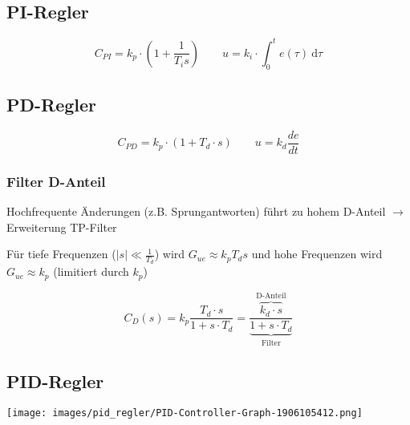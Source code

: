 \documentclass[
  10pt,
  a4paper,
  twocolumn]{article}
\numberwithin{equation}{section}
\begin{document}
\subsection{PI-Regler}\label{pi-regler}

\[
C_{PI}=k_p\cdot\left(1+\frac1{T_i s}\right)\qquad u = k_i\cdot\int_0^t e(\tau)\ {\text{d}\tau}
\]

\subsection{PD-Regler}\label{pd-regler}

\[
C_{PD} = k_p\cdot (1 + T_d\cdot s)\qquad u = k_d\frac{de}{dt}
\]

\subsubsection{Filter D-Anteil}\label{filter-d-anteil}

Hochfrequente Änderungen (z.B. Sprungantworten) führt zu hohem D-Anteil
\(\rightarrow\) Erweiterung TP-Filter

\begin{center}
\end{center}

Für tiefe Frequenzen (\(\lvert s\rvert\ll\frac1{T_d}\)) wird
\(G_{ue}\approx k_p T_ds\) und hohe Frequenzen wird
\(G_{ue}\approx k_p\) (limitiert durch \(k_p\))

\[
C_{D}(s)= k_p\frac{T_d\cdot s}{1+s\cdot T_d} = \frac{\overbrace{k_d\cdot s}^{\text{D-Anteil}}}{\underbrace{1+s\cdot T_d}_{\text{Filter}}}
\]

\subsection{PID-Regler}\label{pid-regler}

\begin{center}
\texttt{[image: images/pid\_regler/PID-Controller-Graph-1906105412.png]}
\end{center}
\end{document}
